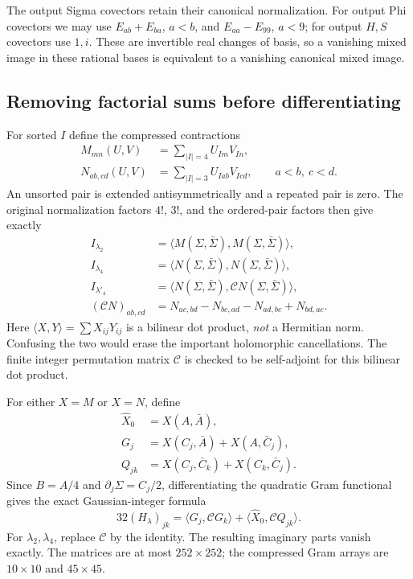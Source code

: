 The output Sigma covectors retain their canonical normalization.
For output Phi covectors we may use $E_{ab}+E_{ba}$, $a<b$, and
$E_{aa}-E_{99}$, $a<9$; for output $H,S$ covectors use $1,i$.
These are invertible real changes of basis, so a vanishing mixed image in
these rational bases is equivalent to a vanishing canonical mixed image.

\subsection{Removing factorial sums before differentiating}

For sorted $I$ define the compressed contractions
\begin{align}
 M_{mn}(U,V)&=\sum_{|I|=4}U_{Im}V_{In},\\
 N_{ab,cd}(U,V)&=\sum_{|I|=3}U_{Iab}V_{Icd},
 \qquad a<b,\ c<d.
\end{align}
An unsorted pair is extended antisymmetrically and a repeated pair is zero.
The original normalization factors $4!$, $3!$, and the ordered-pair factors
then give exactly
\begin{align}
 I_{\lambda_2}&=\langle M(\Sigma,\bar\Sigma),M(\Sigma,\bar\Sigma)\rangle,\\
 I_{\lambda_4}&=\langle N(\Sigma,\bar\Sigma),N(\Sigma,\bar\Sigma)\rangle,\\
 I_{\lambda'_4}&=\langle N(\Sigma,\bar\Sigma),\mathcal C N(\Sigma,\bar\Sigma)\rangle,\\
 (\mathcal C N)_{ab,cd}
 &=N_{ac,bd}-N_{bc,ad}-N_{ad,bc}+N_{bd,ac}.
\end{align}
Here $\langle X,Y\rangle=\sum X_{ij}Y_{ij}$ is a bilinear dot product,
\emph{not} a Hermitian norm.  Confusing the two would erase the important
holomorphic cancellations.  The finite integer permutation matrix
$\mathcal C$ is checked to be self-adjoint for this bilinear dot product.

For either $X=M$ or $X=N$, define
\begin{align}
 \widehat X_0&=X(A,\bar A),\\
 G_j&=X(C_j,\bar A)+X(A,\bar C_j),\\
 Q_{jk}&=X(C_j,\bar C_k)+X(C_k,\bar C_j).
\end{align}
Since $B=A/4$ and $\partial_j\Sigma=C_j/2$, differentiating the
quadratic Gram functional gives the exact Gaussian-integer formula
\begin{equation}
 \boxed{32(H_\lambda)_{jk}
 =\langle G_j,\mathcal C G_k\rangle
  +\langle\widehat X_0,\mathcal C Q_{jk}\rangle.}
\end{equation}
For $\lambda_2,\lambda_4$, replace $\mathcal C$ by the identity.
The resulting imaginary parts vanish exactly.  The matrices are at most
$252\times252$; the compressed Gram arrays are $10\times10$ and
$45\times45$.

